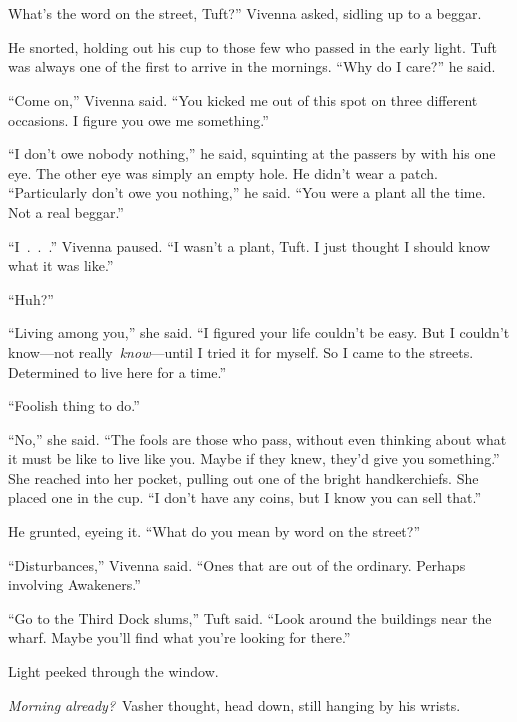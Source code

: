 \chapter{}

What’s the word on the street, Tuft?” Vivenna asked, sidling up to a beggar.

He snorted, holding out his cup to those few who passed in the early light. Tuft was always one of the first to arrive in the mornings. “Why do I care?” he said.

“Come on,” Vivenna said. “You kicked me out of this spot on three different occasions. I figure you owe me something.”

“I don’t owe nobody nothing,” he said, squinting at the passers by with his one eye. The other eye was simply an empty hole. He didn’t wear a patch. “Particularly don’t owe you nothing,” he said. “You were a plant all the time. Not a real beggar.”

“I~.~.~.” Vivenna paused. “I wasn’t a plant, Tuft. I just thought I should know what it was like.”

“Huh?”

“Living among you,” she said. “I figured your life couldn’t be easy. But I couldn’t know—not really~\textit{know}—until I tried it for myself. So I came to the streets. Determined to live here for a time.”

“Foolish thing to do.”

“No,” she said. “The fools are those who pass, without even thinking about what it must be like to live like you. Maybe if they knew, they’d give you something.” She reached into her pocket, pulling out one of the bright handkerchiefs. She placed one in the cup. “I don’t have any coins, but I know you can sell that.”

He grunted, eyeing it. “What do you mean by word on the street?”

“Disturbances,” Vivenna said. “Ones that are out of the ordinary. Perhaps involving Awakeners.”

“Go to the Third Dock slums,” Tuft said. “Look around the buildings near the wharf. Maybe you’ll find what you’re looking for there.”

\orn

Light peeked through the window.

\textit{Morning already?}~Vasher thought, head down, still hanging by his wrists.

